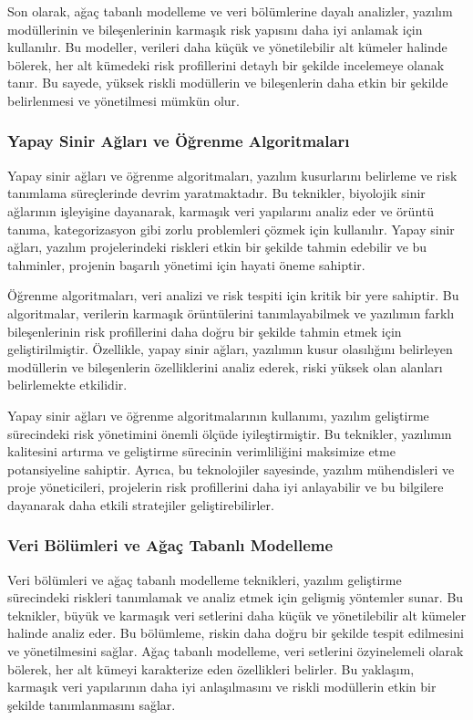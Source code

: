 \documentclass{article}
\begin{document}
Son olarak, ağaç tabanlı modelleme ve veri bölümlerine dayalı analizler, yazılım modüllerinin ve bileşenlerinin karmaşık risk yapısını daha iyi anlamak için kullanılır. Bu modeller, verileri daha küçük ve yönetilebilir alt kümeler halinde bölerek, her alt kümedeki risk profillerini detaylı bir şekilde incelemeye olanak tanır. Bu sayede, yüksek riskli modüllerin ve bileşenlerin daha etkin bir şekilde belirlenmesi ve yönetilmesi mümkün olur.



\subsubsection{Yapay Sinir Ağları ve Öğrenme Algoritmaları}

Yapay sinir ağları ve öğrenme algoritmaları, yazılım kusurlarını belirleme ve risk tanımlama süreçlerinde devrim yaratmaktadır. Bu teknikler, biyolojik sinir ağlarının işleyişine dayanarak, karmaşık veri yapılarını analiz eder ve örüntü tanıma, kategorizasyon gibi zorlu problemleri çözmek için kullanılır. Yapay sinir ağları, yazılım projelerindeki riskleri etkin bir şekilde tahmin edebilir ve bu tahminler, projenin başarılı yönetimi için hayati öneme sahiptir.

Öğrenme algoritmaları, veri analizi ve risk tespiti için kritik bir yere sahiptir. Bu algoritmalar, verilerin karmaşık örüntülerini tanımlayabilmek ve yazılımın farklı bileşenlerinin risk profillerini daha doğru bir şekilde tahmin etmek için geliştirilmiştir. Özellikle, yapay sinir ağları, yazılımın kusur olasılığını belirleyen modüllerin ve bileşenlerin özelliklerini analiz ederek, riski yüksek olan alanları belirlemekte etkilidir.

Yapay sinir ağları ve öğrenme algoritmalarının kullanımı, yazılım geliştirme sürecindeki risk yönetimini önemli ölçüde iyileştirmiştir. Bu teknikler, yazılımın kalitesini artırma ve geliştirme sürecinin verimliliğini maksimize etme potansiyeline sahiptir. Ayrıca, bu teknolojiler sayesinde, yazılım mühendisleri ve proje yöneticileri, projelerin risk profillerini daha iyi anlayabilir ve bu bilgilere dayanarak daha etkili stratejiler geliştirebilirler.



\subsubsection{Veri Bölümleri ve Ağaç Tabanlı Modelleme}

Veri bölümleri ve ağaç tabanlı modelleme teknikleri, yazılım geliştirme sürecindeki riskleri tanımlamak ve analiz etmek için gelişmiş yöntemler sunar. Bu teknikler, büyük ve karmaşık veri setlerini daha küçük ve yönetilebilir alt kümeler halinde analiz eder. Bu bölümleme, riskin daha doğru bir şekilde tespit edilmesini ve yönetilmesini sağlar. Ağaç tabanlı modelleme, veri setlerini özyinelemeli olarak bölerek, her alt kümeyi karakterize eden özellikleri belirler. Bu yaklaşım, karmaşık veri yapılarının daha iyi anlaşılmasını ve riskli modüllerin etkin bir şekilde tanımlanmasını sağlar.
\end{document}
